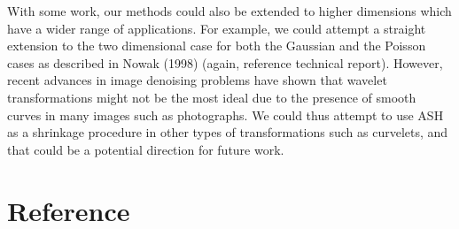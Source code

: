 \documentclass[12pt]{article}
\begin{document}
With some work, our methods could also be extended to higher dimensions which have a wider range of applications. For example, we could attempt a straight extension to the two dimensional case for both the Gaussian and the Poisson cases as described in Nowak (1998) (again, reference technical report). However, recent advances in image denoising problems have shown that wavelet transformations might not be the most ideal due to the presence of smooth curves in many images such as photographs. We could thus attempt to use ASH as a shrinkage procedure in other types of transformations such as curvelets, and that could be a potential direction for future work. 
\section{Reference}
\end{document}
